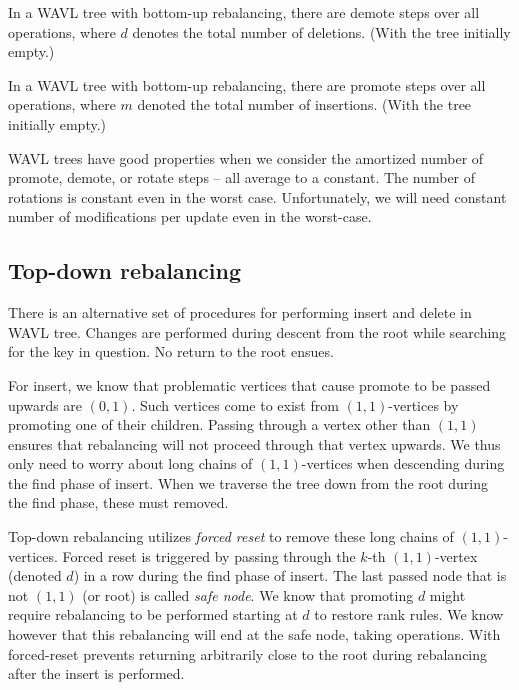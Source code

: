 \begin{thm}
In a WAVL tree with bottom-up rebalancing, there are  demote steps over all operations, where $d$ denotes the total number of deletions. (With the tree initially empty.)
\end{thm}

\begin{thm}
In a WAVL tree with bottom-up rebalancing, there are  promote steps over all operations, where $m$ denoted the total number of insertions. (With the tree initially empty.)
\end{thm}

WAVL trees have good properties when we consider the amortized number of promote, demote, or rotate steps -- all average to a constant. The number of rotations is constant even in the worst case. Unfortunately, we will need constant number of modifications per update even in the worst-case.

\subsection{Top-down rebalancing}

There is an alternative set of procedures for performing insert and delete in WAVL tree. Changes are performed during descent from the root while searching for the key in question. No return to the root ensues.

For insert, we know that problematic vertices that cause promote to be passed upwards are $(0,1)$. Such vertices come to exist from $(1,1)$-vertices by promoting one of their children. Passing through a vertex other than $(1,1)$ ensures that rebalancing will not proceed through that vertex upwards. We thus only need to worry about long chains of $(1,1)$-vertices when descending during the find phase of insert. When we traverse the tree down from the root during the find phase, these must removed.

Top-down rebalancing utilizes \emph{forced reset} to remove these long chains of $(1,1)$-vertices. Forced reset is triggered by passing through the $k$-th $(1,1)$-vertex (denoted $d$) in a row during the find phase of insert. The last passed node that is not $(1,1)$ (or root) is called \textit{safe node}. We know that promoting $d$ might require rebalancing to be performed starting at $d$ to restore rank rules. We know however that this rebalancing will end at the safe node, taking  operations.
With forced-reset prevents returning arbitrarily close to the root during rebalancing after the insert is performed.

